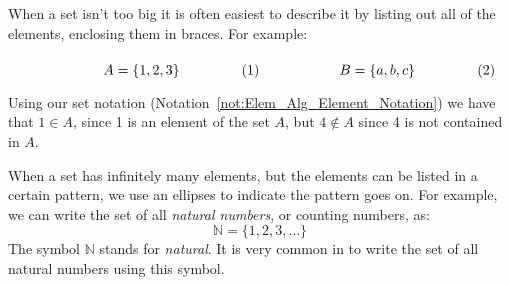 \documentclass[crop=false,class=book,oneside]{standalone}
\begin{document}
            \begin{lexample}
                \label{ex:Elem_Alg_Ex_of_Sets}
                When a set isn't too big it is
                often easiest to describe it by
                listing out all of the elements, enclosing
                them in braces. For example:
                \par\hfill\par
                \begin{subequations}
                    \vspace{-1ex}
                    \begin{minipage}{0.49\textwidth}
                        \begin{equation}
                            A=\{1,2,3\}
                        \end{equation}
                    \end{minipage}
                    \hfill
                    \begin{minipage}{0.49\textwidth}
                        \begin{equation}
                            B=\{a,b,c\}
                        \end{equation}
                    \end{minipage}
                \end{subequations}
                \par\hfill\par
                \vspace{-1ex}
                Using our set notation
                (Notation~\ref{not:Elem_Alg_Element_Notation})
                we have that $1\in{A}$, since 1 is an element
                of the set $A$, but $4\notin{A}$ since 4 is
                not contained in $A$. 
            \end{lexample}
            When a set has infinitely many
            elements, but the elements can be listed
            in a certain pattern, we use an ellipses
            to indicate the pattern goes on.
            For example, we can write the set of all
            \textit{natural numbers}, or counting
            numbers, as:
            \begin{equation}
                \mathbb{N}=\{1,2,3,\hdots\}
            \end{equation}
            The symbol $\mathbb{N}$ stands for
            \textit{natural}. It is very common in
            to write the set of all
            natural numbers using this symbol.
\end{document}
